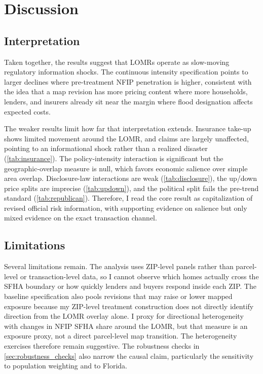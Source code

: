 \documentclass[12pt]{article}
\begin{document}
\section{Discussion}\label{sec:discussion}

\subsection{Interpretation}

Taken together, the results suggest that LOMRs operate as slow-moving regulatory information shocks. The continuous intensity specification points to larger declines where pre-treatment NFIP penetration is higher, consistent with the idea that a map revision has more pricing content where more households, lenders, and insurers already sit near the margin where flood designation affects expected costs.

The weaker results limit how far that interpretation extends. Insurance take-up shows limited movement around the LOMR, and claims are largely unaffected, pointing to an informational shock rather than a realized disaster (\autoref{tab:insurance}). The policy-intensity interaction is significant but the geographic-overlap measure is null, which favors economic salience over simple area overlap. Disclosure-law interactions are weak (\autoref{tab:disclosure}), the up/down price splits are imprecise (\autoref{tab:updown}), and the political split fails the pre-trend standard (\autoref{tab:republican}). Therefore, I read the core result as capitalization of revised official risk information, with supporting evidence on salience but only mixed evidence on the exact transaction channel.

\subsection{Limitations}

Several limitations remain. The analysis uses ZIP-level panels rather than parcel-level or transaction-level data, so I cannot observe which homes actually cross the SFHA boundary or how quickly lenders and buyers respond inside each ZIP. The baseline specification also pools revisions that may raise or lower mapped exposure because my ZIP-level treatment construction does not directly identify direction from the LOMR overlay alone. I proxy for directional heterogeneity with changes in NFIP SFHA share around the LOMR, but that measure is an exposure proxy, not a direct parcel-level map transition. The heterogeneity exercises therefore remain suggestive. The robustness checks in \autoref{sec:robustness_checks} also narrow the causal claim, particularly the sensitivity to population weighting and to Florida.
\end{document}

